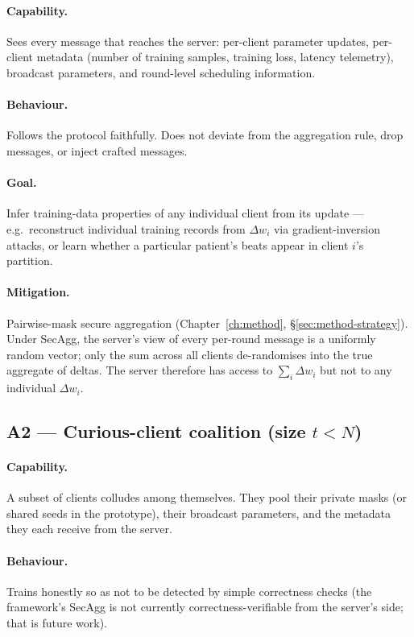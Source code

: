 \documentclass[11pt,a4paper]{report}
\begin{document}
\paragraph{Capability.} Sees every message that reaches the server: per-client
parameter updates, per-client metadata (number of training samples, training
loss, latency telemetry), broadcast parameters, and round-level scheduling
information.

\paragraph{Behaviour.} Follows the protocol faithfully. Does not deviate from
the aggregation rule, drop messages, or inject crafted messages.

\paragraph{Goal.} Infer training-data properties of any individual client
from its update --- e.g.\ reconstruct individual training records from
$\Delta w_i$ via gradient-inversion attacks, or learn whether a particular
patient's beats appear in client $i$'s partition.

\paragraph{Mitigation.} Pairwise-mask secure aggregation
(Chapter~\ref{ch:method}, \S\ref{sec:method-strategy}). Under SecAgg, the
server's view of every per-round message is a uniformly random vector;
only the sum across all clients de-randomises into the true aggregate of
deltas. The server therefore has access to $\sum_i \Delta w_i$ but not to
any individual $\Delta w_i$.

\subsection{A2 --- Curious-client coalition (size $t < N$)}

\paragraph{Capability.} A subset of clients colludes among themselves. They
pool their private masks (or shared seeds in the prototype), their broadcast
parameters, and the metadata they each receive from the server.

\paragraph{Behaviour.} Trains honestly so as not to be detected by simple
correctness checks (the framework's SecAgg is not currently
correctness-verifiable from the server's side; that is future work).
\end{document}
